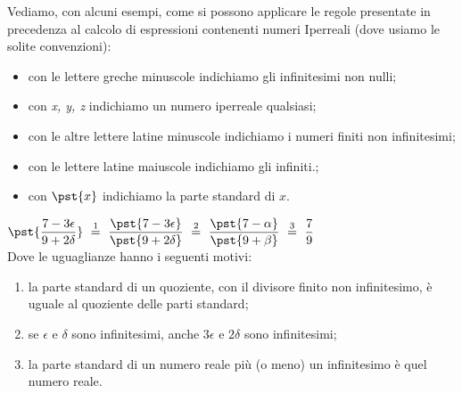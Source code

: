 Vediamo, con alcuni esempi, come si possono applicare 
le regole presentate in precedenza al calcolo di espressioni 
contenenti numeri Iperreali 
(dove usiamo le solite convenzioni):
\begin{itemize} [noitemsep]
 \item con le lettere greche minuscole indichiamo gli infinitesimi non nulli;
 \item con \emph{x, y, z} indichiamo un numero iperreale qualsiasi;
 \item con le altre lettere latine minuscole indichiamo i numeri finiti non 
infinitesimi;
 \item con le lettere latine maiuscole indichiamo gli infiniti.;
 \item con \(\pst{x}\) indichiamo la parte standard di \(x\).
\end{itemize}

\begin{esempio}

\(\pst{\dfrac{7 -3 \epsilon}{9 +2 \delta}} 
~ \stackrel{1}{=} ~
  \dfrac{\pst{7 -3 \epsilon}}{\pst{9 +2 \delta}} 
~ \stackrel{2}{=} ~
  \dfrac{\pst{7 -\alpha}}{\pst{9 +\beta}} 
~ \stackrel{3}{=} ~
  \dfrac{7}{9}\)\\

Dove le uguaglianze hanno i seguenti motivi:
\begin{enumerate} [nosep]
 \item la parte standard di un quoziente, con il divisore finito non 
infinitesimo, è uguale al quoziente delle parti standard; 
 \item se \(\epsilon \text{ e } \delta\) sono infinitesimi, 
 anche \(3\epsilon\) e \(2 \delta\) sono infinitesimi;
 \item la parte standard di un numero reale più (o meno) un infinitesimo è 
quel 
numero reale.
\end{enumerate}
\end{esempio}

